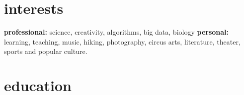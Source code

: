 \documentclass[]{friggeri-cv} %
\begin{document}
\section{interests}

\textbf{professional:} science, creativity, algorithms, big data,
biology \textbf{personal:} learning, teaching, music, hiking,
photography, circus arts, literature, theater, sports and popular culture.


\section{education}
\end{document}
